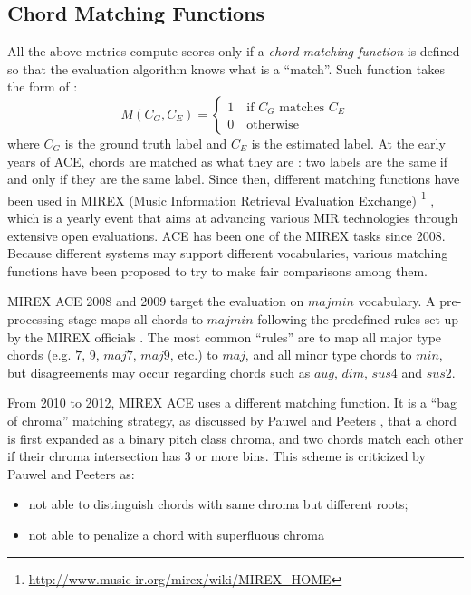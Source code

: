 \subsection{Chord Matching Functions}\label{sec:2-chordmatch}
All the above metrics compute scores only if a {\it chord matching function} is defined so that the evaluation algorithm knows what is a ``match''. Such function takes the form of \cite{harte2010towards}:
\begin{equation}
M(C_G,C_E)=
\begin{cases}
1 \quad \text{if $C_G$ matches $C_E$} \\
0 \quad \text{otherwise}
\end{cases}
\end{equation}
where $C_G$ is the ground truth label and $C_E$ is the estimated label. At the early years of ACE, chords are matched as what they are \cite{fujishima1999realtime,sheh2003chord,bello2005robust}: two labels are the same if and only if they are the same label. Since then, different matching functions have been used in MIREX (Music Information Retrieval Evaluation Exchange) \footnote{\url{http://www.music-ir.org/mirex/wiki/MIREX\_HOME}} \cite{downie2008music}, which is a yearly event that aims at advancing various MIR technologies through extensive open evaluations. ACE has been one of the MIREX tasks since 2008. Because different systems may support different vocabularies, various matching functions have been proposed to try to make fair comparisons among them.

MIREX ACE 2008 and 2009 target the evaluation on $majmin$ vocabulary. A pre-processing stage maps all chords to $majmin$ following the predefined rules set up by the MIREX officials \cite{harte2010towards}. The most common ``rules'' are to map all major type chords (e.g. $7$, $9$, $maj7$, $maj9$, etc.) to $maj$, and all minor type chords to $min$, but disagreements may occur regarding chords such as $aug$, $dim$, $sus4$ and $sus2$.

From 2010 to 2012, MIREX ACE uses a different matching function. It is a ``bag of chroma'' matching strategy, as discussed by Pauwel and Peeters \cite{pauwels2013evaluating}, that a chord is first expanded as a binary pitch class chroma, and two chords match each other if their chroma intersection has 3 or more bins. This scheme is criticized by Pauwel and Peeters \cite{pauwels2013evaluating} as:
\begin{itemize}
\item not able to distinguish chords with same chroma but different roots;
\item not able to penalize a chord with superfluous chroma
\end{itemize}

